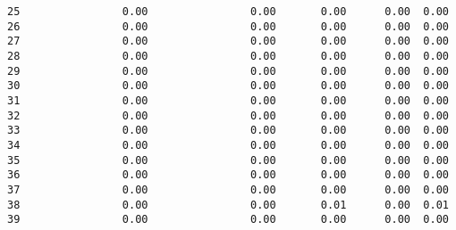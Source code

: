 \documentclass[11pt]{article}
\begin{document}
\begin{tcolorbox}[breakable, size=fbox, boxrule=.5pt, pad at break*=1mm, opacityfill=0]
\begin{Verbatim}[commandchars=\\\{\}]
25                0.00                0.00       0.00      0.00  0.00
26                0.00                0.00       0.00      0.00  0.00
27                0.00                0.00       0.00      0.00  0.00
28                0.00                0.00       0.00      0.00  0.00
29                0.00                0.00       0.00      0.00  0.00
30                0.00                0.00       0.00      0.00  0.00
31                0.00                0.00       0.00      0.00  0.00
32                0.00                0.00       0.00      0.00  0.00
33                0.00                0.00       0.00      0.00  0.00
34                0.00                0.00       0.00      0.00  0.00
35                0.00                0.00       0.00      0.00  0.00
36                0.00                0.00       0.00      0.00  0.00
37                0.00                0.00       0.00      0.00  0.00
38                0.00                0.00       0.01      0.00  0.01
39                0.00                0.00       0.00      0.00  0.00


\end{Verbatim}
\end{tcolorbox}
\end{document}
